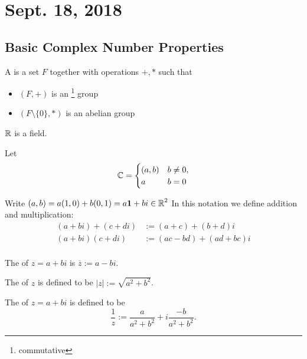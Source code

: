 \section{Sept. 18, 2018}

\subsection{Basic Complex 
Number Properties}

\begin{definition}
    A  is a set $F$ together with operations $+,*$ such that
    \begin{itemize}
        \item $(F,+)$ is an \footnote{commutative} group
        \item $(F \setminus \{ 0 \}, *)$ is an abelian group
    \end{itemize}
\end{definition}

\begin{example}
    $\operatorname{\mathbb{R}}$ is a field.
\end{example}

\noindent
Let
\[ \operatorname{\mathbb{C}} = \begin{cases}
(a,b) & b \ne 0, \\
a & b = 0
\end{cases}
\]

\noindent
Write $(a,b) = a(1,0) + b(0,1) = a\mathbf{1} + bi \in \operatorname{\mathbb{R}}^2$
In this notation we define addition and multiplication:
\begin{align*}
    (a+bi) + (c+di) &:= (a+c) + (b+d)i \\
    (a+bi)(c+di) &:= (ac - bd) + (ad + bc)i \\
\end{align*}

\begin{definition}
    The  of $z = a + bi$ is $\overline{z} := a - bi$.
\end{definition}

\begin{definition}
    The  of $z$ is defined to be $|z| := \sqrt{a^2 + b^2}$.
\end{definition}

\begin{definition}
    The  of $z = a+bi$ is defined to be
    \[ \frac{1}{z} := \frac{a}{a^2 + b^2} + i \frac{-b}{a^2 + b^2}. \]
\end{definition}

